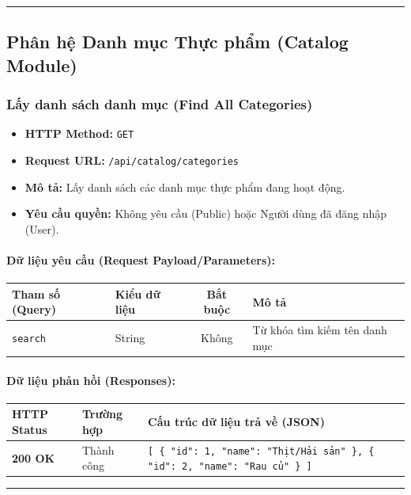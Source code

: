 \documentclass[12pt,a4paper]{article}
\begin{document}
\vskip 0.4cm
\noindent\rule{\textwidth}{0.3pt}
\vskip 0.4cm

\subsection{Phân hệ Danh mục Thực phẩm (Catalog Module)}

\subsubsection{Lấy danh sách danh mục (Find All Categories)}
\begin{itemize}[leftmargin=*]
    \item \textbf{HTTP Method:} \texttt{GET}
    \item \textbf{Request URL:} \texttt{/api/catalog/categories}
    \item \textbf{Mô tả:} Lấy danh sách các danh mục thực phẩm đang hoạt động.
    \item \textbf{Yêu cầu quyền:} Không yêu cầu (Public) hoặc Người dùng đã đăng nhập (User).
\end{itemize}

\paragraph{Dữ liệu yêu cầu (Request Payload/Parameters):}
\begin{longtable}{|p{2.8cm}|p{2.2cm}|c|p{7.0cm}|}
\hline
\textbf{Tham số (Query)} & \textbf{Kiểu dữ liệu} & \textbf{Bắt buộc} & \textbf{Mô tả} \\ \hline
\endhead
\texttt{search} & String & Không & Từ khóa tìm kiếm tên danh mục \\ \hline
\end{longtable}

\paragraph{Dữ liệu phản hồi (Responses):}
\begin{longtable}{|p{2.8cm}|p{3.2cm}|p{8.0cm}|}
\hline
\textbf{HTTP Status} & \textbf{Trường hợp} & \textbf{Cấu trúc dữ liệu trả về (JSON)} \\ \hline
\endhead
\textbf{200 OK} & Thành công & \texttt{[ \{ "id": 1, "name": "Thịt/Hải sản" \}, \{ "id": 2, "name": "Rau củ" \} ]} \\ \hline
\end{longtable}

\vskip 0.4cm
\noindent\rule{\textwidth}{0.3pt}
\vskip 0.4cm
\end{document}
